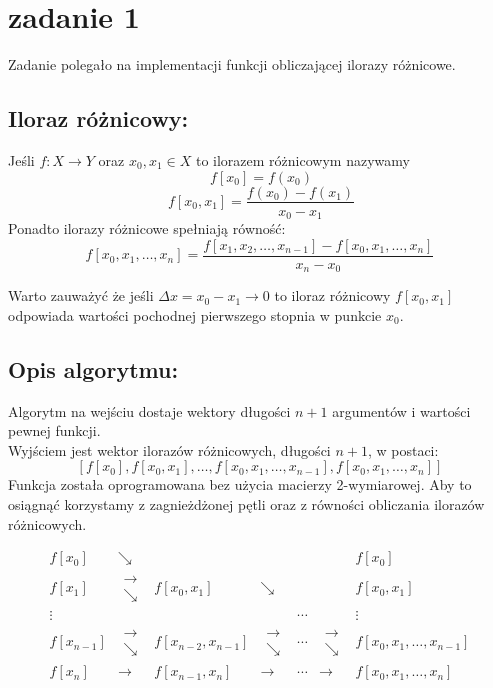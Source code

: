 \section{zadanie 1}
Zadanie polegało na implementacji funkcji obliczającej ilorazy różnicowe.

\subsection{Iloraz różnicowy: }
Jeśli \(f: X \rightarrow Y\) oraz \(x_0, x_1 \in X\) to ilorazem różnicowym nazywamy
\[\ f[x_0] = f(x_0)\]
\[\ f[x_0, x_1] = \frac{f(x_0) - f(x_1)}{x_0 - x_1}\]
Ponadto ilorazy różnicowe spełniają równość:
\[ f[x_0, x_1, \ldots, x_n] = \frac{f[x_1, x_2, \ldots, x_{n-1}] - f[x_0, x_1, \ldots, x_n]}{x_n - x_0} \]

Warto zauważyć że jeśli \(\Delta x = x_0 - x_1 \rightarrow 0 \) to iloraz różnicowy \(f[x_0, x_1]\) odpowiada wartości pochodnej pierwszego stopnia w punkcie \(x_0\).

\subsection{Opis algorytmu: }
Algorytm na wejściu dostaje wektory długości \(n + 1\) argumentów i wartości pewnej funkcji.\\ Wyjściem jest wektor ilorazów różnicowych, długości \(n + 1\), w postaci: 
\[ [f[x_0], f[x_0, x_1], \ldots,f[x_0, x_1, \ldots, x_{n - 1}], f[x_0, x_1, \ldots, x_n] ]\] 
Funkcja została oprogramowana bez użycia macierzy 2-wymiarowej. 
Aby to osiągnąć korzystamy z zagnieżdżonej pętli oraz z równości obliczania ilorazów różnicowych.

\begin{align*}
  f[x_0] &\searrow & & & & & f[x_0]\\
  f[x_1] & \begin{array}{c} \rightarrow \\ \searrow \end{array} &f[x_0, x_1]&\searrow & & & f[x_0, x_1]\\
  \vdots & & & &\cdots & &\vdots\\
  f[x_{n - 1}] &\begin{array}{c} \rightarrow \\ \searrow \end{array} &f[x_{n-2}, x_{n-1}] &\begin{array}{c} \rightarrow \\ \searrow \end{array} &\cdots &\begin{array}{c} \rightarrow \\ \searrow \end{array} &f[x_{0}, x_{1}, \ldots, x_{n-1}]\\
  f[x_n] &\rightarrow & f[x_{n-1}, x_{n}] & \rightarrow &\cdots &\rightarrow &f[x_{0}, x_{1}, \ldots, x_n]
\end{align*}

